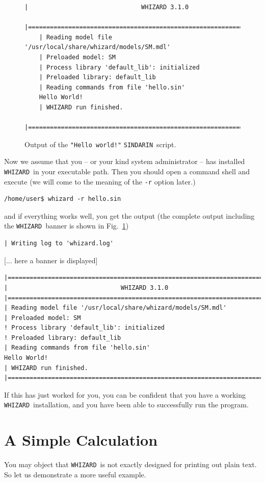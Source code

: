 \documentclass[12pt]{book}
\newcommand{\ttt}[1]{\texttt{#1}}
\newcommand{\whizard}{\ttt{WHIZARD}}
\newcommand{\sindarin}{\ttt{SINDARIN}}
\begin{document}
\begin{figure}
\begin{scriptsize}
\begin{Verbatim}[frame=single]
    |                               WHIZARD 3.1.0
    |=============================================================================|
    | Reading model file '/usr/local/share/whizard/models/SM.mdl'
    | Preloaded model: SM
    | Process library 'default_lib': initialized
    | Preloaded library: default_lib
    | Reading commands from file 'hello.sin'
    Hello World!
    | WHIZARD run finished.
    |=============================================================================|
\end{Verbatim}
\end{scriptsize}
  \caption{Output of the \ttt{"Hello world!"} \sindarin\ script.\label{fig:helloworld}}
\end{figure}

Now we assume that you -- or your kind system administrator -- has
installed \whizard\ in your executable path.  Then you should open a
command shell and execute (we will come to the meaning of the
\verb|-r| option later.)
\begin{verbatim}
/home/user$ whizard -r hello.sin
\end{verbatim}
and if everything works well, you get the output (the complete output
including the \whizard\ banner is shown in Fig.~\ref{fig:helloworld})
\begin{footnotesize}
\begin{verbatim}
| Writing log to 'whizard.log'
\end{verbatim}
\centerline{[... here a banner is displayed]}
\begin{Verbatim}
|=============================================================================|
|                               WHIZARD 3.1.0
|=============================================================================|
| Reading model file '/usr/local/share/whizard/models/SM.mdl'
| Preloaded model: SM
! Process library 'default_lib': initialized
! Preloaded library: default_lib
| Reading commands from file 'hello.sin'
Hello World!
| WHIZARD run finished.
|=============================================================================|
\end{Verbatim}
\end{footnotesize}
If this has just worked for you, you can be confident that you have a working
\whizard\ installation, and you have been able to successfully run the
program.

\section{A Simple Calculation}
You may object that \whizard\ is not exactly designed for printing out
plain text.  So let us demonstrate a more useful example.
\end{document}

